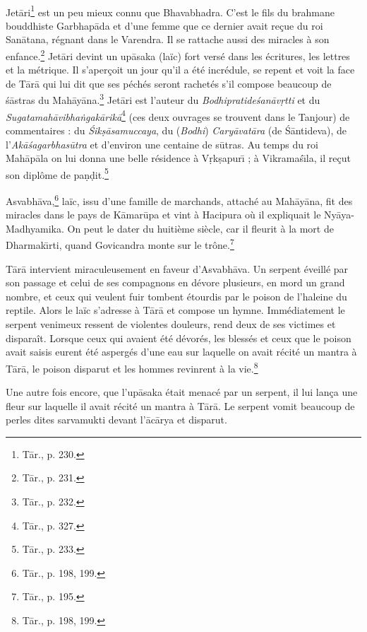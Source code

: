 \documentclass[a4paper, 11pt, oneside, french]{article}
\begin{document}
\paragraph{}
Jet\={a}ri\footnote{T\={a}r., p. 230.} est un peu mieux connu que Bhavabhadra. C'est le fils du brahmane bouddhiste Garbhap\={a}da et d'une femme que ce dernier avait reçue du roi San\={a}tana, régnant dans le Varendra. Il se rattache aussi des miracles à son enfance.\footnote{T\={a}r., p. 231.} Jet\={a}ri devint un up\={a}saka (laïc) fort versé dans les écritures, les lettres et la métrique. Il s'aperçoit un jour qu'il a été incrédule, se repent et voit la face de T\={a}r\={a} qui lui dit que ses péchés seront rachetés s'il compose beaucoup de \'{s}\={a}stras du Mah\={a}y\={a}na.\footnote{T\={a}r., p. 232.} Jet\={a}ri est l'auteur du \emph{Bodhipratide\'{s}an\={a}v\d{r}tti} et du \emph{Sugatamah\={a}vibha\.{n}gak\={a}rik\={a}}\footnote{T\={a}r., p. 327.} (ces deux ouvrages se trouvent dans le Tanjour) de commentaires : du \emph{\'{S}ik\d{s}\={a}samuccaya}, du (\emph{Bodhi}) \emph{Cary\={a}vat\={a}ra} (de \'{S}\={a}ntideva), de l'\emph{Ak\={a}\'{s}agarbhas\={u}tra} et d'environ une centaine de s\={u}tras. Au temps du roi Mah\={a}p\={a}la on lui donna une belle résidence à V\d{r}k\d{s}apur\={\i} ; à Vikrama\'{s}\={\i}la, il reçut son diplôme de pa\d{n}\d{d}it.\footnote{T\={a}r., p. 233.}

Asvabh\={a}va,\footnote{T\={a}r., p. 198, 199.} laïc, issu d'une famille de marchands, attaché au Mah\={a}y\={a}na, fit des miracles dans le pays de K\={a}mar\={u}pa et vint à Hacipura où il expliquait le Ny\={a}ya-Madhyamika. On peut le dater du huitième siècle, car il fleurit à la mort de Dharmak\={\i}rti, quand Govicandra monte sur le trône.\footnote{T\={a}r., p. 195.}

T\={a}r\={a} intervient miraculeusement en faveur d'Asvabh\={a}va. Un serpent éveillé par son passage et celui de ses compagnons en dévore plusieurs, en mord un grand nombre, et ceux qui veulent fuir tombent étourdis par le poison de l'haleine du reptile. Alors le laïc s'adresse à T\={a}r\={a} et compose un hymne. Immédiatement le serpent venimeux ressent de violentes douleurs, rend deux de ses victimes et disparaît. Lorsque ceux qui avaient été dévorés, les blessés et ceux que le poison avait saisis eurent été aspergés d'une eau sur laquelle on avait récité un mantra à T\={a}r\={a}, le poison disparut et les hommes revinrent à la vie.\footnote{T\={a}r., p. 198, 199.}

Une autre fois encore, que l'up\={a}saka était menacé par un serpent, il lui lança une fleur sur laquelle il avait récité un mantra à T\={a}r\={a}. Le serpent vomit beaucoup de perles dites sarvamukti devant l'\={a}c\={a}rya et disparut.
\end{document}
